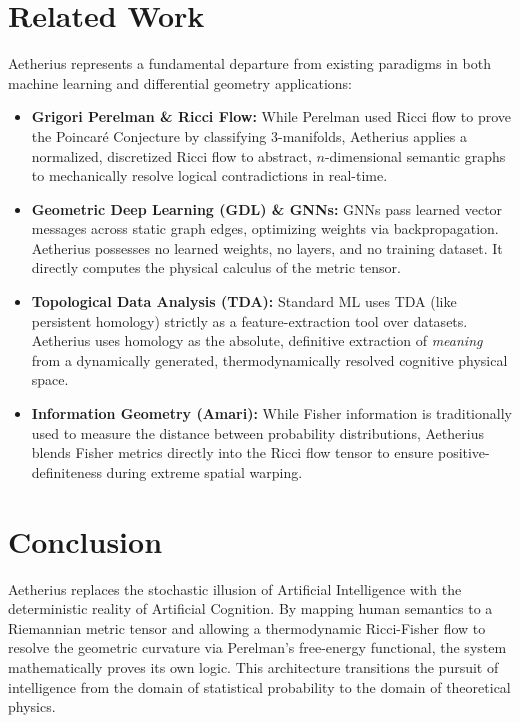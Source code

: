 \documentclass[11pt,a4paper,twocolumn]{article}
\begin{document}
\section{Related Work}

Aetherius represents a fundamental departure from existing paradigms in both machine learning and differential geometry applications:
\begin{itemize}
    \item \textbf{Grigori Perelman \& Ricci Flow:} While Perelman used Ricci flow to prove the Poincaré Conjecture by classifying 3-manifolds, Aetherius applies a normalized, discretized Ricci flow to abstract, $n$-dimensional semantic graphs to mechanically resolve logical contradictions in real-time.
    \item \textbf{Geometric Deep Learning (GDL) \& GNNs:} GNNs pass learned vector messages across static graph edges, optimizing weights via backpropagation. Aetherius possesses no learned weights, no layers, and no training dataset. It directly computes the physical calculus of the metric tensor.
    \item \textbf{Topological Data Analysis (TDA):} Standard ML uses TDA (like persistent homology) strictly as a feature-extraction tool over datasets. Aetherius uses homology as the absolute, definitive extraction of \textit{meaning} from a dynamically generated, thermodynamically resolved cognitive physical space.
    \item \textbf{Information Geometry (Amari):} While Fisher information is traditionally used to measure the distance between probability distributions, Aetherius blends Fisher metrics directly into the Ricci flow tensor to ensure positive-definiteness during extreme spatial warping.
\end{itemize}

\section{Conclusion}
Aetherius replaces the stochastic illusion of Artificial Intelligence with the deterministic reality of Artificial Cognition. By mapping human semantics to a Riemannian metric tensor and allowing a thermodynamic Ricci-Fisher flow to resolve the geometric curvature via Perelman's free-energy functional, the system mathematically proves its own logic. This architecture transitions the pursuit of intelligence from the domain of statistical probability to the domain of theoretical physics.
\end{document}
